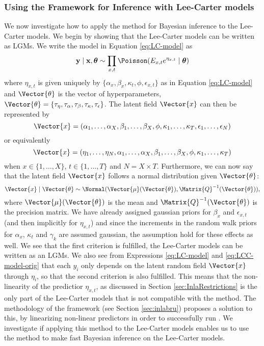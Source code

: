 \subsubsection{Using the \inla Framework for Inference with Lee-Carter models}
\newpar We now investigate how to apply the \inla method for Bayesian inference to the Lee-Carter models. We begin by showing that the Lee-Carter models can be written as LGMs. We write the model in Equation \ref{eq:LC-model} as 
\begin{equation}
    \textbf{y}\mid \textbf{x}, \boldsymbol{\theta} \sim \prod_{x,t}\Poisson(E_{x,t}e^{\eta_{x,t}}\mid \boldsymbol{\theta})
\end{equation}
where $\eta_{x,t}$ is given uniquely by $\{\alpha_x, \beta_x, \kappa_t, \phi, \epsilon_{x,t}\}$ as in Equation \ref{eq:LC-model} and $\Vector{\theta}$ is the vector of hyperparameters, $\Vector{\theta} = \{\tau_{\eta}, \tau_{\alpha}, \tau_{\beta}, \tau_{\kappa}, \tau_\epsilon\}$. The latent field $\Vector{x}$ can then be represented by 
\begin{equation*}
    \Vector{x} = (\alpha_1,\ldots,\alpha_X,\beta_1,\ldots,\beta_X, \phi, \kappa_1,\ldots, \kappa_T, \epsilon_1, \ldots, \epsilon_N)
\end{equation*}
or equivalently 
\begin{equation}
    \Vector{x} = (\eta_1,\ldots,\eta_N,\alpha_1,\ldots,\alpha_X,\beta_1,\ldots,\beta_X, \phi, \kappa_1,\ldots, \kappa_T)
    \label{eq:LChyperparams}
\end{equation}
when $x\in \{1,\ldots,X\}$, $t\in\{1,\ldots,T\}$ and $N=X\times T$. Furthermore, we can now say that the latent field $\Vector{x}$ follows a normal distribution given $\Vector{\theta}$:
\begin{equation}
        \Vector{x}\mid \Vector{\theta} \sim \Normal(\Vector{\mu}(\Vector{\theta}), \Matrix{Q}^{-1}(\Vector{\theta})),
        \label{eq:XNormalDist}
\end{equation}
where $\Vector{\mu}(\Vector{\theta})$ is the mean and $\Matrix{Q}^{-1}(\Vector{\theta})$ is the precision matrix. We have already assigned gaussian priors for $\beta_x$ and $\epsilon_{x,t}$ (and then implicitly for $\eta_{x,t}$) and since the increments in the random walk priors for $\alpha_x$, $\kappa_t$ and $\gamma_k$ are assumed gaussian, the assumption hold for these effects as well. 
\newline
We see that the first criterion is fulfilled, the Lee-Carter models can be written as an LGMs. We also see from Expressions \ref{eq:LC-model} and \ref{eq:LCC-model-orig} that each $y_i$ only depends on the latent random field $\Vector{x}$ through $\eta_i$, so that the second criterion is also fulfilled. This means that the non-linearity of the predictior $\eta_{x,t}$, as discussed in Section \ref{sec:InlaRestrictions} is the only part of the Lee-Carter models that is not compatible with the \inla method. The methodology of the \inlabru framework (see Section \ref{sec:inlabru}) proposes a solution to this, by linearizing non-linear predictors in order to successfully run \inla. We investigate if applying this method to the Lee-Carter models enables us to use the \inla method to make fast Bayesian inference \textcolor{myDarkGreen}{on the Lee-Carter models. }


